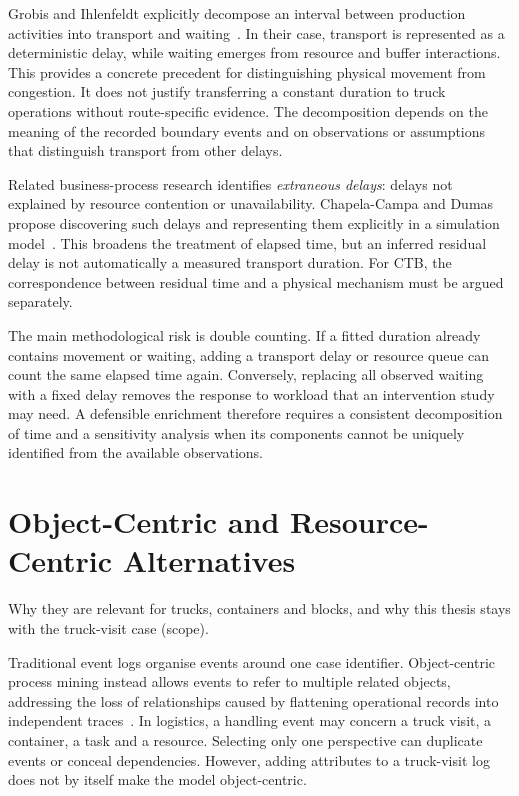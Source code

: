 Grobis and Ihlenfeldt explicitly decompose an interval between production activities into transport and waiting~\cite{Grobis2026SimulationDevelopment}. In their case, transport is represented as a deterministic delay, while waiting emerges from resource and buffer interactions. This provides a concrete precedent for distinguishing physical movement from congestion. It does not justify transferring a constant duration to truck operations without route-specific evidence. The decomposition depends on the meaning of the recorded boundary events and on observations or assumptions that distinguish transport from other delays.

Related business-process research identifies \emph{extraneous delays}: delays not explained by resource contention or unavailability. Chapela-Campa and Dumas propose discovering such delays and representing them explicitly in a simulation model~\cite{RWChapela2024Delays}. This broadens the treatment of elapsed time, but an inferred residual delay is not automatically a measured transport duration. For CTB, the correspondence between residual time and a physical mechanism must be argued separately.

The main methodological risk is double counting. If a fitted duration already contains movement or waiting, adding a transport delay or resource queue can count the same elapsed time again. Conversely, replacing all observed waiting with a fixed delay removes the response to workload that an intervention study may need. A defensible enrichment therefore requires a consistent decomposition of time and a sensitivity analysis when its components cannot be uniquely identified from the available observations.

\section{Object-Centric and Resource-Centric Alternatives}
\label{sec:rw_alternatives}
\begin{hints}
\item Why they are relevant for trucks, containers and blocks, and why this thesis stays with the truck-visit case (scope).
\end{hints}

Traditional event logs organise events around one case identifier. Object-centric process mining instead allows events to refer to multiple related objects, addressing the loss of relationships caused by flattening operational records into independent traces~\cite{VanDerAalst2023OCPM}. In logistics, a handling event may concern a truck visit, a container, a task and a resource. Selecting only one perspective can duplicate events or conceal dependencies. However, adding attributes to a truck-visit log does not by itself make the model object-centric.

